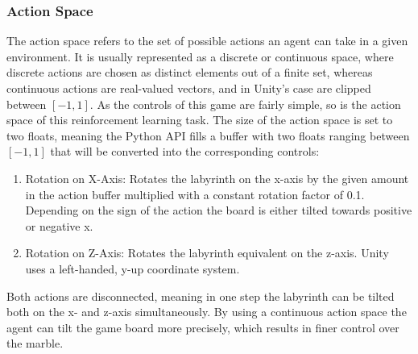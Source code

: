 \subsubsection{Action Space}
The action space refers to the set of possible actions an agent can take in a given environment.
It is usually represented as a discrete or continuous space, where discrete actions are chosen as distinct elements
out of a finite set, whereas continuous actions are real-valued vectors, and in Unity's case are clipped between $[-1, 1]$.
As the controls of this game are fairly simple, so is the action space of this reinforcement learning task.
The size of the action space is set to two floats, meaning the Python API fills a buffer with two floats ranging between $[-1, 1]$ that will be converted into
the corresponding controls:
\begin{enumerate}
    \item{Rotation on X-Axis}: Rotates the labyrinth on the x-axis by the given amount in the action buffer multiplied with a constant rotation factor of 0.1.
    Depending on the sign of the action the board is either tilted towards positive or negative x.
    \item{Rotation on Z-Axis}: Rotates the labyrinth equivalent on the z-axis.
    Unity uses a left-handed, y-up coordinate system.
\end{enumerate}
Both actions are disconnected, meaning in one step the labyrinth can be tilted both on the x- and z-axis simultaneously.
By using a continuous action space the agent can tilt the game board more precisely, which results in finer control over the marble.

